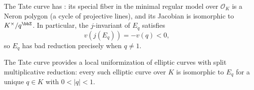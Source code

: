 \begin{definition}
    The Tate curve has : its special fiber in the minimal regular model over $\mathcal{O}_K$ is a Neron polygon (a cycle of projective lines), and its Jacobian is isomorphic to $K^\times/q^{\bbZ}$. In particular, the $j$-invariant of $E_q$ satisfies
    $$v(j(E_q)) = -v(q) < 0,$$
    so $E_q$ has bad reduction precisely when $q \neq 1$.

    The Tate curve provides a local uniformization of elliptic curves with split multiplicative reduction: every such elliptic curve over $K$ is isomorphic to $E_q$ for a unique $q \in K$ with $0 < |q| < 1$.
\end{definition}